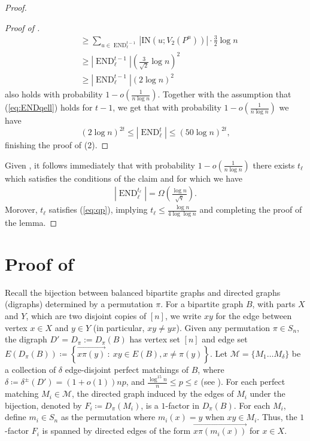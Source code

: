 \documentclass{article}
\DeclareMathOperator{\END}{END}
\newcommand{\IN}[2]{\text{IN}\left(#1; #2 \right)}
\begin{document}
\begin{proof}
\begin{proof}[Proof of ]
\begin{align*}
		&\ge \sum_{u \in \END_{\ell}^{t-1}} \left|\IN{u}{V_2(P^u)} \right| \cdot \tfrac{3}{2}\log n \\
		&\ge \left|\END_{\ell}^{t-1} \right| \left(\tfrac{3}{\sqrt{2}} \log n \right)^2 \\
		&\ge \left|\END_{\ell}^{t-1} \right| \left(2\log n \right)^2
		\end{align*}
		also holds with probability $1 - o\left(\frac{1}{n\log n} \right)$.
		Together with the assumption that (\ref{eq:ENDqell}) holds for $t-1$, we get that with probability $1 - o\left(\frac{1}{n\log n} \right)$ we have
		\[ \left(2\log n \right)^{2t} \le \left|\END_{\ell}^t \right| \le \left(50\log n \right)^{2t}, \]
		finishing the proof of (2).
	\end{proof}
	
	Given , it follows immediately that with probability $1 - o\left(\frac{1}{n\log n} \right)$ there exists $t_{\ell}$ which satisfies the conditions of the claim and for which we have
	\begin{align*}
	\left|\END_{\ell}^{t_{\ell}} \right| = \Omega\left(\tfrac{\log n}{\sqrt{q}} \right).
	\end{align*}
	Morover, $t_{\ell}$ satisfies (\ref{eq:qp}), implying $t_{\ell} \le \frac{\log n}{4\log\log n}$ and completing the proof of the lemma.
\end{proof}

\section{\texorpdfstring{Proof of }{Proof of Lemma 5.2}}
\label{sec:Appendix3Moment}

Recall the bijection between balanced bipartite graphs and directed graphs (digraphs) determined by a permutation $\pi$. 
For a bipartite graph $B$, with parts $X$ and $Y$, which are two disjoint copies of $[n]$, we write $xy$ for the edge between vertex $x\in X$ and $y\in Y$ (in particular, $xy \neq yx$). Given any permutation $\pi \in S_n$, the digraph $D' = D_{\pi}:=D_{\pi}(B)$ has vertex set $[n]$ and edge set $E\left(D_\pi(B) \right) \coloneqq \left\{\overrightarrow{x \pi(y)} ~:~ xy \in E(B) , x \neq \pi(y)\right\}$.
Let $\mathcal{M}=\{M_1 \ldots M_{\delta}\}$ be a collection of $\delta$ edge-disjoint perfect matchings of $B$, where $\delta \coloneqq \delta^{\pm}\left(D' \right) = (1+o(1))np$, and $\frac{\log^{15} n}{n} \le p \le \varepsilon$ (see ).
For each perfect matching $M_i\in \mathcal M$, the directed graph induced by the edges of $M_i$ under the bijection, denoted by $F_i \coloneqq D_\pi(M_i)$, is a $1$-factor in $D_\pi(B)$. 
For each $M_i$, define $m_i \in S_n$ as the permutation where $m_i(x)=y$ when $xy \in M_i$.
Thus, the $1$-factor $F_i$ is spanned by directed edges of the form $\overrightarrow{x \pi(m_i(x))}$ for $x \in X$.
\end{document}
